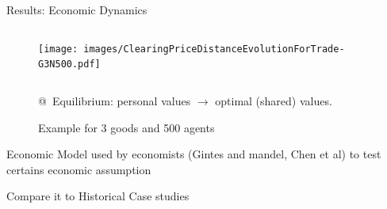 \documentclass[12pt, notes=show]{beamer}
\begin{document}
\begin{frame}{Results: Economic Dynamics}
	\begin{figure}
	    \caption{Example for 3 goods and 500 agents}
	    \begin{columns}
		\texttt{[image: images/ClearingPriceDistanceEvolutionForTrade-G3N500.pdf]}\\
	    \end{columns}
		@~Equilibrium: personal values  $\rightarrow$ optimal (shared) values.
	\end{figure}
	
\end{frame}


\begin{frame}{Economic}
    Model used by economists (Gintes and mandel, Chen et al) to test certains economic assumption
    
\end{frame}

\begin{frame}
    Compare it to Historical Case studies
    
\end{frame}
\end{document}
